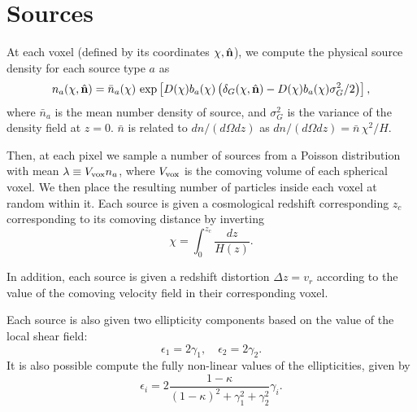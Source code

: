 \documentclass[a4paper,10pt]{article}
\newcommand{\nv}{\hat{\bf n}}
\begin{document}
\section{Sources}
  At each voxel (defined by its coordinates $\chi,\nv$), we compute the physical source
  density for each source type $a$ as
  \begin{equation}
    n_a(\chi,\hat{\bf n})=
    \bar{n}_a(\chi)\,
    \exp\left[D(\chi)b_a(\chi)\left(\delta_G(\chi,\hat{\bf n})-
      D(\chi)b_a(\chi)\sigma_G^2/2\right)\right],
  \end{equation}
  where $\bar{n}_a$ is the mean number density of source, and $\sigma_G^2$
  is the variance of the density field at $z=0$. $\bar{n}$ is related to
  $dn/(d\Omega dz)$ as $dn/(d\Omega dz)=\bar{n}\,\chi^2/H$.

  Then, at each pixel we sample a number of sources from a Poisson distribution with mean
  $\lambda\equiv V_{\rm vox}n_a$, where $V_{\rm vox}$ is the comoving volume of each
  spherical voxel. We then place the resulting number of particles inside each voxel at
  random within it. Each source is given a cosmological redshift corresponding $z_c$
  corresponding to its comoving distance by inverting
  \begin{equation}
    \chi=\int_0^{z_c}\frac{dz}{H(z)}.
  \end{equation}

  In addition, each source is given a redshift distortion $\Delta z=v_r$ according to the
  value of the comoving velocity field in their corresponding voxel.

  Each source is also given two ellipticity components based on the value of the local
  shear field:
  \begin{equation}
    \epsilon_1=2\gamma_1,\hspace{12pt}\epsilon_2=2\gamma_2.
  \end{equation}
  It is also possible compute the fully non-linear values of the ellipticities, given
  by
  \begin{equation}
    \epsilon_i=2\frac{1-\kappa}{(1-\kappa)^2+\gamma_1^2+\gamma_2^2}\gamma_i.
  \end{equation}
\end{document}
